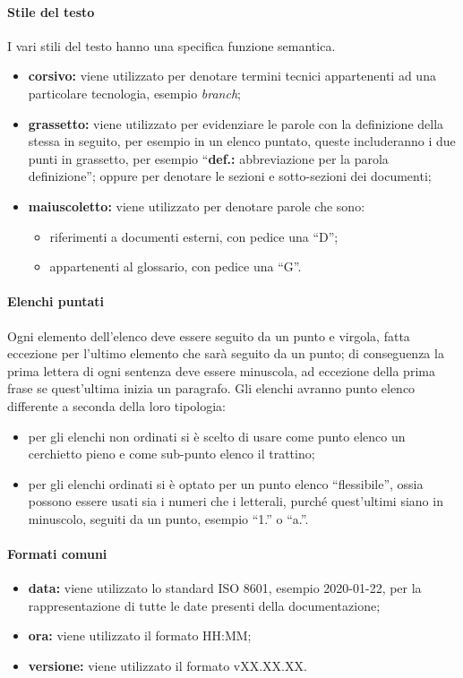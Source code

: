 			\paragraph{Stile del testo}
				I vari stili del testo hanno una specifica funzione semantica.
				\begin{itemize}
					\item \textbf{corsivo:} viene utilizzato per denotare termini tecnici appartenenti ad una particolare tecnologia, esempio \textit{branch};
					\item \textbf{grassetto:} viene utilizzato per evidenziare le parole con la definizione della stessa in seguito, per esempio in un elenco puntato, queste includeranno i due punti in grassetto, per esempio ``\textbf{def.:} abbreviazione per la parola definizione''; oppure per denotare le sezioni e sotto-sezioni dei documenti;
					\item \textbf{maiuscoletto:} viene utilizzato per denotare parole che sono:
						\begin{itemize}
							\item riferimenti a documenti esterni, con pedice una ``D'';
							\item appartenenti al glossario, con pedice una ``G''.
						\end{itemize}
				\end{itemize}
			\paragraph{Elenchi puntati}
				Ogni elemento dell'elenco deve essere seguito da un punto e virgola, fatta eccezione per l'ultimo elemento che sarà seguito da un punto; di conseguenza la prima lettera di ogni sentenza deve essere minuscola, ad eccezione della prima frase se quest'ultima inizia un paragrafo. Gli elenchi avranno punto elenco differente a seconda della loro tipologia:
				\begin{itemize}
					\item per gli elenchi non ordinati si è scelto di usare come punto elenco un cerchietto pieno e come sub-punto elenco il trattino;
					\item per gli elenchi ordinati si è optato per un punto elenco ``flessibile'', ossia possono essere usati sia i numeri che i letterali, purché quest'ultimi siano in minuscolo, seguiti da un punto, esempio ``1.'' o ``a.''.
				\end{itemize}
			\paragraph{Formati comuni}
				\begin{itemize}
					\item \textbf{data:} viene utilizzato lo standard ISO 8601, esempio 2020-01-22, per la rappresentazione di tutte le date presenti della documentazione;
					\item \textbf{ora:} viene utilizzato il formato HH:MM;
					\item \textbf{versione:} viene utilizzato il formato vXX.XX.XX.
				\end{itemize}
